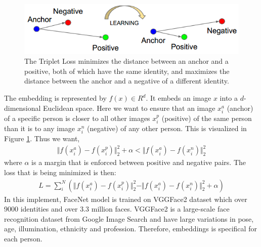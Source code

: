 \documentclass[journal, twocolumn]{IEEEtran}
\begin{document}
\begin{figure}
    \centering
    \includegraphics[width=1\linewidth]{img/triplet.png}
	\caption{The Triplet Loss minimizes the distance between an anchor and a positive, both of which have the same identity, and maximizes the distance between the anchor and a negative of a different identity.}
	\label{fig:triplet}
\end{figure}

The embedding is represented by $f(x) \in R^d$. It embeds an image $x$ into a $d$-dimensional Euclidean space. Here we want to ensure that an image $x_i^a$ (anchor) of a specific person is closer to all other images $x_i^p$ (positive) of the same person than it is to any image $x_i^n$ (negative) of any other person. This is visualized in Figure \ref{fig:triplet}. Thus we want, 
\begin{align}
	\Vert f(x_i^a) - f(x_i^p) \Vert_2^2 + \alpha < \Vert f(x_i^a) - f(x_i^n) \Vert_2^2
\end{align}
where $\alpha$ is a margin that is enforced between positive and negative pairs. The loss that is being minimized is then: 
\begin{align}
	L = \sum_i^N(\Vert f(x_i^a) - f(x_i^p) \Vert_2^2  - \Vert f(x_i^a) - f(x_i^n) \Vert_2^2 + \alpha)
\end{align}
In this implement, FaceNet model is trained on VGGFace2 dataset which over 9000 identities and over 3.3 million faces. VGGFace2 is a large-scale face recognition dataset from Google Image Search and have large variations in pose, age, illumination, ethnicity and profession. Therefore, embeddings is specifical for each person.


\end{document}
